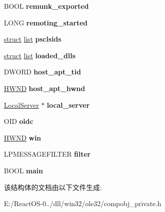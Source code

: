 \begin{DoxyCompactItemize}
\item 
\mbox{\label{structapartment_a9b4500bb553ce3697681ed21df5653fc}} 
B\+O\+OL {\bfseries remunk\+\_\+exported}
\item 
\mbox{\label{structapartment_a58b68c9f210b21a91f94de5f453dee01}} 
L\+O\+NG {\bfseries remoting\+\_\+started}
\item 
\mbox{\label{structapartment_a31fdc8f53143f7e14225eee9a6ad9236}} 
\hyperlink{interfacestruct}{struct} \hyperlink{classlist}{list} {\bfseries psclsids}
\item 
\mbox{\label{structapartment_a36167f8ffdcd3c3e6e175db3fa163725}} 
\hyperlink{interfacestruct}{struct} \hyperlink{classlist}{list} {\bfseries loaded\+\_\+dlls}
\item 
\mbox{\label{structapartment_a977b1b73ea438a176a312b13e4761a14}} 
D\+W\+O\+RD {\bfseries host\+\_\+apt\+\_\+tid}
\item 
\mbox{\label{structapartment_aeb0302969c3a4fc3613e0e10818c9099}} 
\hyperlink{interfacevoid}{H\+W\+ND} {\bfseries host\+\_\+apt\+\_\+hwnd}
\item 
\mbox{\label{structapartment_af6249c32ce7ff8677cecd6e8150760c5}} 
\hyperlink{struct_local_server}{Local\+Server} $\ast$ {\bfseries local\+\_\+server}
\item 
\mbox{\label{structapartment_a97f5f7ed01996b5fe842633efd2b03f5}} 
O\+ID {\bfseries oidc}
\item 
\mbox{\label{structapartment_a3004bce48adbd7777e28272efb089fd1}} 
\hyperlink{interfacevoid}{H\+W\+ND} {\bfseries win}
\item 
\mbox{\label{structapartment_a6f62137e7fa26331f19db7332eff8dcd}} 
L\+P\+M\+E\+S\+S\+A\+G\+E\+F\+I\+L\+T\+ER {\bfseries filter}
\item 
\mbox{\label{structapartment_a041acd64fd91cb9652ed96c134f4cb55}} 
B\+O\+OL {\bfseries main}
\end{DoxyCompactItemize}


该结构体的文档由以下文件生成\+:\begin{DoxyCompactItemize}
\item 
E\+:/\+React\+O\+S-\/0../dll/win32/ole32/compobj\+\_\+private.\+h\end{DoxyCompactItemize}
